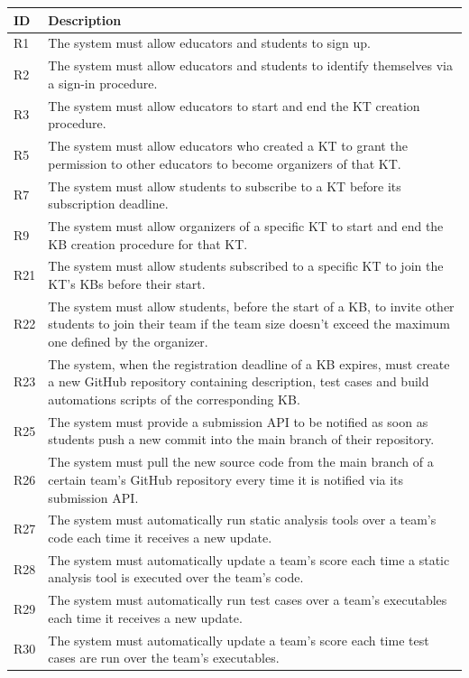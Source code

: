 \documentclass[11pt]{report}
\begin{document}
\begin{longtable}[h] {|p{10mm} p{130mm}|}
\hline
\textbf{ID} & \textbf{Description} \\ \hline
R1 & The system must allow educators and students to sign up. \\ 
R2 & The system must allow educators and students to identify themselves via a sign-in procedure. \\ 
R3 & The system must allow educators to start and end the KT creation procedure.\\
R5 & The system must allow educators who created a KT to grant the permission to other educators to become organizers of that KT. \\ 
R7 & The system must allow students to subscribe to a KT before its subscription deadline. \\ 
R9 & The system must allow organizers of a specific KT to start and end the KB creation procedure for that KT\@. \\
R21 & The system must allow students subscribed to a specific KT to join the KT’s KBs before their start. \\ 
R22 & The system must allow students, before the start of a KB, to invite other students to join their team if the team size doesn't exceed the maximum one defined by the organizer. \\
R23 & The system, when the registration deadline of a KB expires, must create a new GitHub repository containing description, test cases and build automations scripts of the corresponding KB. \\ 
R25 & The system must provide a submission API to be notified as soon as students push a new commit into the main branch of their repository. \\ 
R26 & The system must pull the new source code from the main branch of a certain team’s GitHub repository every time it is notified via its submission API. \\ 
R27 & The system must automatically run static analysis tools over a team’s code each time it receives a new update. \\ 
R28 & The system must automatically update a team’s score each time a static analysis tool is executed over the team’s code. \\
R29 & The system must automatically run test cases over a team’s executables each time it receives a new update. \\ 
R30 & The system must automatically update a team’s score each time test cases are run over the team’s executables. \\ 

\end{longtable}
\end{document}
